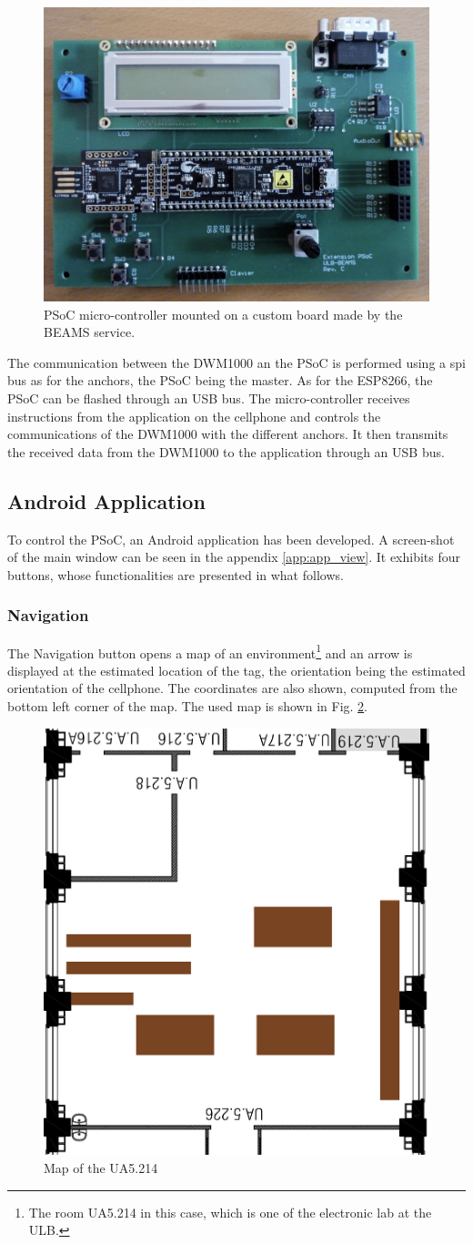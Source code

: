 \begin{figure}[H]
	\centering
	\includegraphics[width=.55\linewidth]{Images/psoc.png}
	\caption{PSoC micro-controller mounted on a custom board made by the BEAMS service.}
	\label{fig:psoc}
\end{figure}

The communication between the DWM1000 an the PSoC is performed using a \gls{spi} bus as for the anchors, the PSoC being the master. As for the ESP8266, the PSoC can be flashed through an USB bus. The micro-controller receives instructions from the application on the cellphone and controls the communications of the DWM1000 with the different anchors. It then transmits the received data from the DWM1000 to the application through an USB bus.

\subsection{Android Application}

To control the PSoC, an Android application has been developed. A screen-shot of the main window can be seen in the appendix \ref{app:app_view}. It exhibits four buttons, whose functionalities are presented in what follows.

\subsubsection{Navigation}

The Navigation button opens a map of an environment\footnote{The room UA5.214 in this case, which is one of the electronic lab at the ULB.} and an arrow is displayed at the estimated location of the tag, the orientation being the estimated orientation of the cellphone. The coordinates are also shown, computed from the bottom left corner of the map. The used map is shown in Fig. \ref{fig:ua5_map}.

\begin{figure}[H]
	\centering
	\includegraphics[width=.4\linewidth]{Images/little_room.png}
	\caption{Map of the UA5.214}
	\label{fig:ua5_map}
\end{figure}


